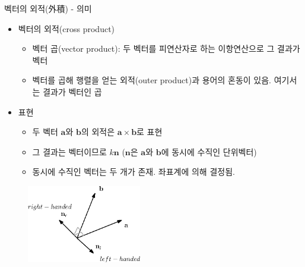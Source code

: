 \begin{frame}{벡터의 외적(外積) - 의미}

\begin{itemize}
\item 벡터의 외적(cross product)
	\begin{itemize}
	\item 벡터 곱(vector product): 두 벡터를 피연산자로 하는 이항연산으로 그 결과가 벡터
	\item 벡터를 곱해 행렬을 얻는 외적(outer product)과 용어의 혼동이 있음. 여기서는 결과가 벡터인 곱
	\end{itemize}
\item 표현
	\begin{itemize}
	\item 두 벡터 $\mathbf a$와 $\mathbf b$의 외적은 $\mathbf a \times \mathbf b$로 표현
	\item 그 결과는 벡터이므로 $k \mathbf n$ ($\mathbf n$은 $\mathbf a$와 $\mathbf b$에 동시에 수직인 단위벡터)
	\item 동시에 수직인 벡터는 두 개가 존재. 좌표계에 의해 결정됨.
	\end{itemize}
\end{itemize}

\begin{figure}
\includegraphics[width=5cm]{Math_vector/crossProductDir.eps}
\end{figure}

\end{frame}


